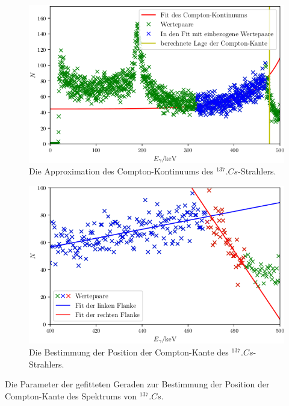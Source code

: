 \begin{figure}
	\centering
	\includegraphics[width=\linewidth-70pt,height=\textheight-70pt,keepaspectratio]{content/images/Cs137Kon.png}
	\caption{Die Approximation des Compton-Kontinuums des $^{137}.{Cs}$-Strahlers.}
	\label{fig:Comptonkontinuum}
\end{figure}

\begin{figure}
	\centering
	\includegraphics[width=\linewidth-70pt,height=\textheight-70pt,keepaspectratio]{content/images/Cs137Emax.png}
	\caption{Die Bestimmung der Position der Compton-Kante des $^{137}.{Cs}$-Strahlers.}
	\label{fig:Emax}
\end{figure}

\begin{table}
	\centering
	\caption{Die Parameter der gefitteten Geraden zur Bestimmung der Position der Compton-Kante des Spektrums von $^{137}.{Cs}$.}
	
\end{table}

